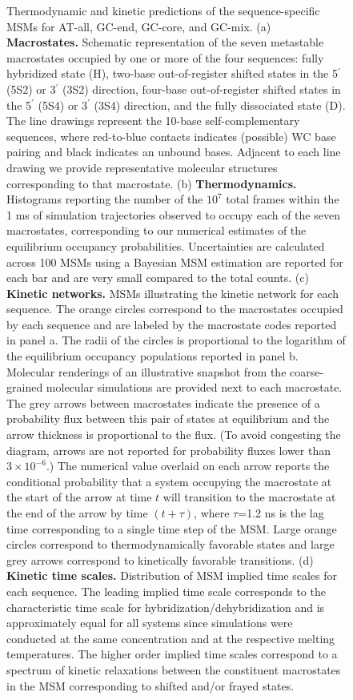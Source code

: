 \documentclass[journal=jpcbfk,manuscript=article]{achemso}
\newcommand*{\rood}[1]{{\color{red}{#1}}}
\begin{document}
\begin{figure}[ht!]
        \caption{Thermodynamic and kinetic predictions of the sequence-specific MSMs \rood{fitted at the sequence melting temperatures} for AT-all, GC-end, GC-core, and GC-mix. (a) \textbf{Macrostates.} Schematic representation of the seven metastable macrostates occupied by one or more of the four sequences: fully hybridized state (H), two-base out-of-register shifted states in the 5$^\prime$ (5S2) or 3$^\prime$ (3S2) direction, four-base out-of-register shifted states in the 5$^\prime$ (5S4) or 3$^\prime$ (3S4) direction, and the fully dissociated state (D). The line drawings represent the 10-base self-complementary sequences, where red-to-blue contacts indicates (possible) WC base pairing and black indicates an unbound bases. Adjacent to each line drawing we provide representative molecular structures corresponding to that macrostate. (b) \textbf{Thermodynamics.} Histograms reporting the number of the $10^7$ total frames within the 1 ms of simulation trajectories observed to occupy each of the seven macrostates, corresponding to our numerical estimates of the equilibrium occupancy probabilities. Uncertainties are calculated across 100 MSMs using a Bayesian MSM estimation are reported for each bar and are very small compared to the total counts. \rood{Values are reported on a log y-axis to make the small populations of the shifted and frayed states visible.} (c) \textbf{Kinetic networks.} MSMs illustrating the kinetic network for each sequence. The orange circles correspond to the macrostates occupied by each sequence and are labeled by the macrostate codes reported in panel a. The radii of the circles is proportional to the logarithm of the equilibrium occupancy populations reported in panel b. Molecular renderings of an illustrative snapshot from the coarse-grained molecular simulations are provided next to each macrostate. The grey arrows between macrostates indicate the presence of a probability flux between this pair of states at equilibrium and the arrow thickness is proportional to the flux. (To avoid congesting the diagram, arrows are not reported for probability fluxes lower than $3\times10^{-6}$.) The numerical value overlaid on each arrow reports the conditional probability that a system occupying the macrostate at the start of the arrow at time $t$ will transition to the macrostate at the end of the arrow by time $(t+\tau)$, where $\tau$=1.2 ns is the lag time corresponding to a single time step of the MSM. Large orange circles correspond to thermodynamically favorable states and large grey arrows correspond to kinetically favorable transitions. (d) \textbf{Kinetic time scales.} Distribution of MSM implied time scales for each sequence. The leading implied time scale corresponds to the characteristic time scale for hybridization/dehybridization and is approximately equal for all systems since simulations were conducted at the same concentration and at the respective melting temperatures. The higher order implied time scales correspond to a spectrum of kinetic relaxations between the constituent macrostates in the MSM corresponding to shifted and/or frayed states.
    }
    \label{fig:allseq_table}
\end{figure}
\end{document}
